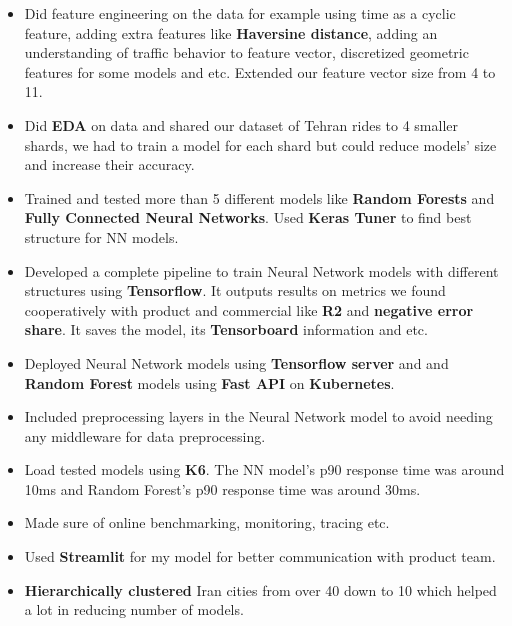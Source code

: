 {\begin{itemize}[label=\textbullet]
\begin{itemize}
                              also used outlier removal algorithms like \textbf{isolation forest} to remove outliers. It reduced our data to 1/2.
                        \item Did feature engineering on the data for example using time as a cyclic feature,
                              adding extra features like \textbf{Haversine distance}, adding an understanding
                              of traffic behavior to feature vector, discretized geometric features for some models and etc.
                              Extended our feature vector size from 4 to 11.
                        \item Did \textbf{EDA} on data and shared our dataset of Tehran rides to 4 smaller shards,
                              we had to train a model for each shard but could reduce models' size and increase their accuracy.
                        \item Trained and tested more than 5 different models like \textbf{Random Forests} and \textbf{Fully Connected Neural Networks}. Used \textbf{Keras Tuner} to find best structure for NN models.
                        \item Developed a complete pipeline to train Neural Network models with different structures using \textbf{Tensorflow}. It outputs results on metrics we found cooperatively with product and commercial like \textbf{R2} and \textbf{negative error share}. It saves the model, its \textbf{Tensorboard} information and etc.
                        \item Deployed Neural Network models using \textbf{Tensorflow server} and and \textbf{Random Forest} models using \textbf{Fast API} on \textbf{Kubernetes}.
                        \item Included preprocessing layers in the Neural Network model to avoid needing any middleware for data preprocessing.
                        \item Load tested models using \textbf{K6}. The NN model's p90 response time was around 10ms and Random Forest's p90 response time was around 30ms.
                        \item Made sure of online benchmarking, monitoring, tracing etc.
                        \item Used \textbf{Streamlit} for my model for better communication with product team.
                        \item \textbf{Hierarchically clustered} Iran cities from over 40 down to 10 which helped a lot in reducing number of models.

\end{itemize}
\end{itemize}}
